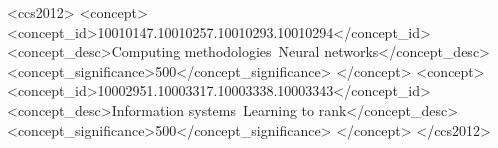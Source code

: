 \documentclass[sigconf]{acmart}
\begin{document}
\begin{CCSXML}
<ccs2012>
<concept>
<concept_id>10010147.10010257.10010293.10010294</concept_id>
<concept_desc>Computing methodologies~Neural networks</concept_desc>
<concept_significance>500</concept_significance>
</concept>
<concept>
<concept_id>10002951.10003317.10003338.10003343</concept_id>
<concept_desc>Information systems~Learning to rank</concept_desc>
<concept_significance>500</concept_significance>
</concept>
</ccs2012>
\end{CCSXML}







\maketitle




% 





\balance

\end{document}
